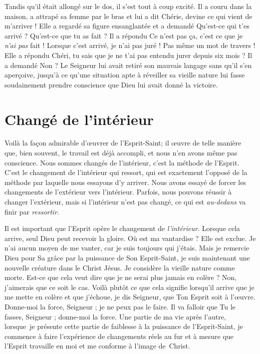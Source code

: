 Tandis qu'il était allongé sur le dos, il s'est tout à coup excité.
 Il a couru dans la maison, a attrapé sa femme par le bras et lui a dit\frcolon{}
 \Og Chérie, devine ce qui vient de m'arriver ! \Fg{}
 Elle a regardé sa figure ensanglantée et a demandé\frcolon{}
 \Og Qu'est-ce qui t'es arrivé ? Qu'est-ce que tu as fait ? \Fg{}
 Il a répondu\frcolon{}
 \Og Ce n'est pas ça, c'est ce que je \emph{n'ai pas} fait !
 Lorsque c'est arrivé, je n'ai pas juré ! Pas même un mot de travers ! \Fg{}
 Elle a répondu\frcolon{}
 \Og Chéri, tu sais que je ne t'ai pas entendu jurer depuis six mois ? \Fg{}
 Il a demandé\frcolon{} \Og Non ? \Fg{}
 Le Seigneur lui avait retiré son mauvais langage sans qu'il s'en aperçoive,
 jusqu'à ce qu'une situation apte à réveiller sa vieille nature
 lui fasse soudainement prendre conscience
 que Dieu lui avait donné la victoire.


\section{Chang\'e de l'int\'erieur}

Voilà la façon admirable d'œuvrer de l'Esprit-Saint;
 il \oe{}uvre de telle manière que, bien souvent,
 le travail est déjà accompli, et nous n'en avons même pas conscience.
 Nous sommes changés de l'intérieur, c'est la méthode de l'Esprit.
 C'est le changement de l'intérieur qui ressort,
 qui est exactement l'opposé de la méthode par laquelle
 nous essayons d'y arriver.
 Nous avons essayé de forcer les changements de l'extérieur
 vers l'intérieur.
 Parfois, nous pouvons réussir à changer l'extérieur,
 mais si l'intérieur n'est pas changé,
 ce qui est \emph{au-dedans} va finir par \emph{ressortir}.

Il est important que l'Esprit opère le changement de \emph{l'intérieur}.
 Lorsque cela arrive, seul Dieu peut recevoir la gloire.
 Où est ma vantardise ? Elle est exclue.
 Je n'ai aucun moyen de me vanter, car je suis toujours qui j'étais.
 Mais je remercie Dieu pour Sa grâce\frcolon{} par la puissance de Son Esprit-Saint,
 je suis maintenant une nouvelle créature dans le Christ Jésus.
 Je considère la vieille nature comme morte.
 Est-ce que cela veut dire que je ne serai plus jamais en colère ?
 Non, j'aimerais que ce soit le cas.
 Voilà plutôt ce que cela signifie\frcolon{} lorsqu'il arrive que je me mette en colère
 et que j'échoue, je dis\frcolon{}
 \Og Seigneur, que Ton Esprit soit à l'œuvre. Donne-moi la force,
 Seigneur ; je ne peux pas le faire. Il va falloir que Tu le fasses,
 Seigneur ; donne-moi la force. \Fg{}
 Une partie de ma vie après l'autre, lorsque~je présente cette partie
 de faiblesse à la puissance de l'Esprit-Saint, je commence à faire
 l'expérience  de changements réels au fur et à mesure
 que l'Esprit travaille en moi et me conforme à l'image de~Christ.


